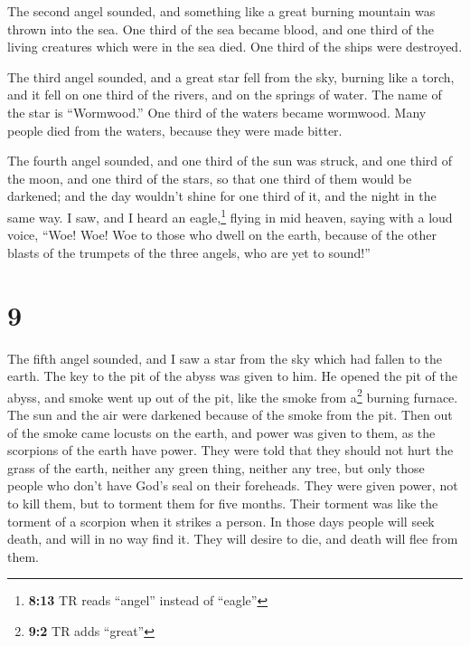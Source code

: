  The second angel sounded, and something like a great
burning mountain was thrown into the sea. One third of the sea became
blood,  and one third of the living creatures which were
in the sea died. One third of the ships were destroyed.

 The third angel sounded, and a great star fell from the
sky, burning like a torch, and it fell on one third of the rivers, and
on the springs of water.  The name of the star is
``Wormwood.'' One third of the waters became wormwood. Many people died
from the waters, because they were made bitter.

 The fourth angel sounded, and one third of the sun was
struck, and one third of the moon, and one third of the stars, so that
one third of them would be darkened; and the day wouldn't shine for one
third of it, and the night in the same way.  I saw, and I
heard an eagle,\footnote{\textbf{8:13} TR reads ``angel'' instead of
  ``eagle''} flying in mid heaven, saying with a loud voice, ``Woe! Woe!
Woe to those who dwell on the earth, because of the other blasts of the
trumpets of the three angels, who are yet to sound!''

\hypertarget{section-8}{%
\section{9}\label{section-8}}

 The fifth angel sounded, and I saw a star from the sky
which had fallen to the earth. The key to the pit of the abyss was given
to him.  He opened the pit of the abyss, and smoke went up
out of the pit, like the smoke from a\footnote{\textbf{9:2} TR adds
  ``great''} burning furnace. The sun and the air were darkened because
of the smoke from the pit.  Then out of the smoke came
locusts on the earth, and power was given to them, as the scorpions of
the earth have power.  They were told that they should not
hurt the grass of the earth, neither any green thing, neither any tree,
but only those people who don't have God's seal on their foreheads.
 They were given power, not to kill them, but to torment
them for five months. Their torment was like the torment of a scorpion
when it strikes a person.  In those days people will seek
death, and will in no way find it. They will desire to die, and death
will flee from them.

